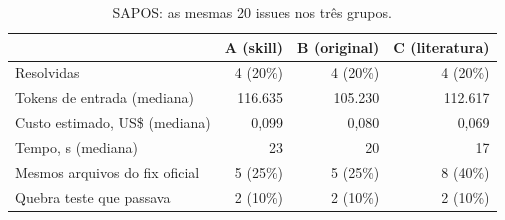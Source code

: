 \begin{table}[t]
\caption{SAPOS: as mesmas 20 issues nos três grupos.}
\label{tab:sapos}
\small
\begin{tabular}{lrrr}
\toprule
 & A (skill) & B (original) & C (literatura) \\
\midrule
Resolvidas & 4 (20\%) & 4 (20\%) & 4 (20\%) \\
Tokens de entrada (mediana) & 116.635 & 105.230 & 112.617 \\
Custo estimado, US\$ (mediana) & 0,099 & 0,080 & 0,069 \\
Tempo, s (mediana) & 23 & 20 & 17 \\
Mesmos arquivos do fix oficial & 5 (25\%) & 5 (25\%) & 8 (40\%) \\
Quebra teste que passava & 2 (10\%) & 2 (10\%) & 2 (10\%) \\
\bottomrule
\end{tabular}
\end{table}
